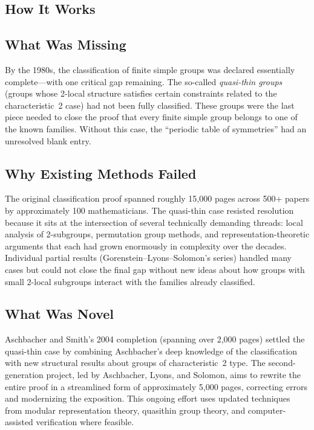 \subsection{How It Works}

\subsection{What Was Missing}
By the 1980s, the classification of finite simple groups was declared essentially complete---with one critical gap remaining. The so-called \emph{quasi-thin groups} (groups whose 2-local structure satisfies certain constraints related to the characteristic~2 case) had not been fully classified. These groups were the last piece needed to close the proof that every finite simple group belongs to one of the known families. Without this case, the ``periodic table of symmetries'' had an unresolved blank entry.

\subsection{Why Existing Methods Failed}
The original classification proof spanned roughly 15,000 pages across 500+ papers by approximately 100 mathematicians. The quasi-thin case resisted resolution because it sits at the intersection of several technically demanding threads: local analysis of 2-subgroups, permutation group methods, and representation-theoretic arguments that each had grown enormously in complexity over the decades. Individual partial results (Gorenstein--Lyons--Solomon's series) handled many cases but could not close the final gap without new ideas about how groups with small 2-local subgroups interact with the families already classified.

\subsection{What Was Novel}
Aschbacher and Smith's 2004 completion (spanning over 2,000 pages) settled the quasi-thin case by combining Aschbacher's deep knowledge of the classification with new structural results about groups of characteristic~2 type. The second-generation project, led by Aschbacher, Lyons, and Solomon, aims to rewrite the entire proof in a streamlined form of approximately 5,000 pages, correcting errors and modernizing the exposition. This ongoing effort uses updated techniques from modular representation theory, quasithin group theory, and computer-assisted verification where feasible.

